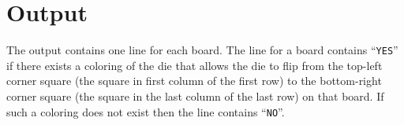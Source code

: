 \section*{Output}

The output contains one line for each board. The line for a board
contains ``\verb+YES+'' if there exists a coloring of the die that allows the
die to flip from the top-left corner square (the square in first
column of the first row) to the bottom-right corner square (the square
in the last column of the last row) on that board. If such a coloring
does not exist then the line contains ``\verb+NO+''.
